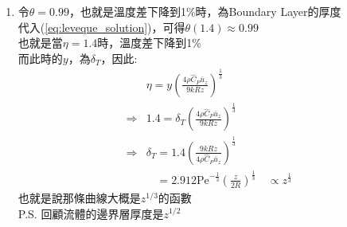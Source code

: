 \documentclass[../main.tex]{subfiles}
\begin{document}
\begin{itemize}
\begin{enumerate}
\begin{equation}
    \end{equation}
    而$\int_0^\infty e^{-x} x^{n-1} dx = \Gamma(n)$\\
    因此:
    \begin{equation}
      1 = C_2 \cdot \frac{1}{3} \Gamma\left(
        \frac{1}{3}
      \right)
    \end{equation}
    又因為$\Gamma$函數具有下列性質:
    \begin{align}
      \Gamma(n+1) &= n\Gamma(n) \\
      \Gamma(n+1) &= n! \quad (n\in \mathbb{N})
    \end{align}
    因此:
    \begin{equation}
       \frac{1}{3} \Gamma\left(
        \frac{1}{3}\right) = \Gamma\left(
          \frac{4}{3}
        \right)
    \end{equation}
    故:
    \begin{equation}
      C_2 = \frac{1}{\Gamma\left(
        \frac{4}{3}
      \right)}
    \end{equation}
    最後解為:
    \begin{equation}
      \boxed{\theta(\eta) = \frac{1}{\Gamma\left(
        \frac{4}{3}
      \right)} \int_0^\eta e^{-x^3} dx} \label{eq:leveque_solution}
    \end{equation}
    \item 令$\theta=0.99$，也就是溫度差下降到1\%時，為Boundary Layer的厚度\\
    代入(\ref{eq:leveque_solution})，可得$\theta(1.4) \approx 0.99$\\
    也就是當$\eta = 1.4$時，溫度差下降到1\%\\
    而此時的$y$，為$\delta_T$，因此:
    \begin{align}
      &\eta = y\left(
        \frac{4\rho \hat C_P \overline u_z}{9 k R z}
      \right)^{\frac{1}{3}} \nonumber\\
      \Rightarrow & 1.4 = \delta_T \left(
        \frac{4\rho \hat C_P \overline u_z}{9 k R z}
      \right)^{\frac{1}{3}} \nonumber\\
      \Rightarrow & \delta_T = 1.4 \left(
        \frac{9 k R z}{4\rho \hat C_P \overline u_z}
      \right)^{\frac{1}{3}} \nonumber\\
       & \phantom{\delta_T} = 2.912 \text{Pe}^{-\frac{1}{3}}\left(
        \frac{z}{2R}
      \right)^{\frac{1}{3}} \quad \boxed{\propto z^{\frac{1}{3}}}
    \end{align}
    也就是說那條曲線大概是$z^{1/3}$的函數\\
    P.S. 回顧流體的邊界層厚度是$z^{1/2}$\\

\end{enumerate}
\end{itemize}
\end{document}
